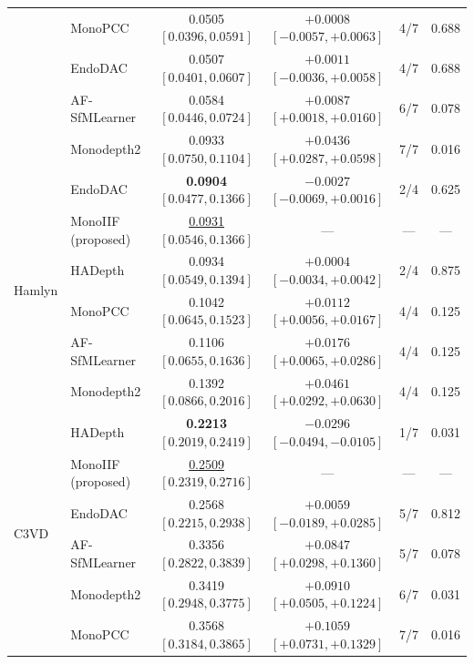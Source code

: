 \documentclass[a4paper,fleqn]{cas-dc}
\begin{document}
\begin{table}[t]
\begin{tabular}{llcccc}
 & MonoPCC            & 0.0505 $[0.0396, 0.0591]$             & $+0.0008$ $[-0.0057, +0.0063]$          & 4/7   & 0.688 \\
 & EndoDAC            & 0.0507 $[0.0401, 0.0607]$             & $+0.0011$ $[-0.0036, +0.0058]$          & 4/7   & 0.688 \\
 & AF-SfMLearner      & 0.0584 $[0.0446, 0.0724]$             & $\mathbf{+0.0087}$ $[+0.0018, +0.0160]$ & 6/7   & 0.078 \\
 & Monodepth2         & 0.0933 $[0.0750, 0.1104]$             & $\mathbf{+0.0436}$ $[+0.0287, +0.0598]$ & 7/7   & 0.016 \\
\midrule
\multirow{6}{*}{Hamlyn}
 & EndoDAC            & \textbf{0.0904} $[0.0477, 0.1366]$    & $-0.0027$ $[-0.0069, +0.0016]$          & 2/4   & 0.625 \\
 & MonoIIF (proposed) & \underline{0.0931} $[0.0546, 0.1366]$ & ---                                     & ---   & ---   \\
 & HADepth            & 0.0934 $[0.0549, 0.1394]$             & $+0.0004$ $[-0.0034, +0.0042]$          & 2/4   & 0.875 \\
 & MonoPCC            & 0.1042 $[0.0645, 0.1523]$             & $\mathbf{+0.0112}$ $[+0.0056, +0.0167]$ & 4/4   & 0.125 \\
 & AF-SfMLearner      & 0.1106 $[0.0655, 0.1636]$             & $\mathbf{+0.0176}$ $[+0.0065, +0.0286]$ & 4/4   & 0.125 \\
 & Monodepth2         & 0.1392 $[0.0866, 0.2016]$             & $\mathbf{+0.0461}$ $[+0.0292, +0.0630]$ & 4/4   & 0.125 \\
\midrule
\multirow{6}{*}{C3VD}
 & HADepth            & \textbf{0.2213} $[0.2019, 0.2419]$    & $\mathbf{-0.0296}$ $[-0.0494, -0.0105]$ & 1/7   & 0.031 \\
 & MonoIIF (proposed) & \underline{0.2509} $[0.2319, 0.2716]$ & ---                                     & ---   & ---   \\
 & EndoDAC            & 0.2568 $[0.2215, 0.2938]$             & $+0.0059$ $[-0.0189, +0.0285]$          & 5/7   & 0.812 \\
 & AF-SfMLearner      & 0.3356 $[0.2822, 0.3839]$             & $\mathbf{+0.0847}$ $[+0.0298, +0.1360]$ & 5/7   & 0.078 \\
 & Monodepth2         & 0.3419 $[0.2948, 0.3775]$             & $\mathbf{+0.0910}$ $[+0.0505, +0.1224]$ & 6/7   & 0.031 \\
 & MonoPCC            & 0.3568 $[0.3184, 0.3865]$             & $\mathbf{+0.1059}$ $[+0.0731, +0.1329]$ & 7/7   & 0.016 \\
\bottomrule
\end{tabular}
\end{table}
\end{document}
